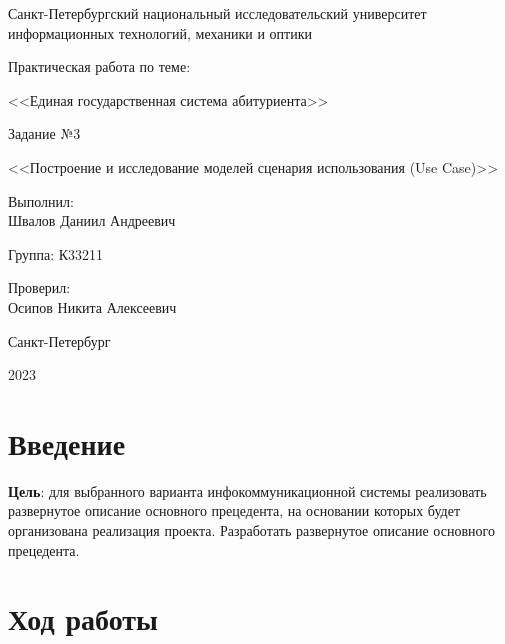 \documentclass[a4paper, 14pt]{extarticle}
\begin{document}
\begin{titlepage}
  \vspace{0pt plus2fill}
  \noindent

  \vspace{0pt plus6fill}
  \begin{center}
    Санкт-Петербургский национальный исследовательский университет
    информационных технологий, механики и оптики

    \vspace{0pt plus2fill}

    Практическая работа по теме:

    <<Единая государственная система абитуриента>>

    \vspace{0pt plus1fill}

    Задание №3

    <<Построение и исследование моделей сценария использования (Use Case)>>

  \end{center}

  \vspace{0pt plus7fill}
  \begin{flushright}
    Выполнил: \\
    Швалов Даниил Андреевич

    Группа: К33211

    Проверил: \\
    Осипов Никита Алексеевич
  \end{flushright}

  \vspace{0pt plus2fill}
  \begin{center}
    Санкт-Петербург

    2023
  \end{center}
\end{titlepage}

\setcounter{page}{2}

\section{Введение}

\textbf{Цель}: для выбранного варианта инфокоммуникационной системы реализовать
развернутое описание основного прецедента, на основании которых будет
организована реализация проекта. Разработать развернутое описание основного
прецедента.

\section{Ход работы}
\end{document}
